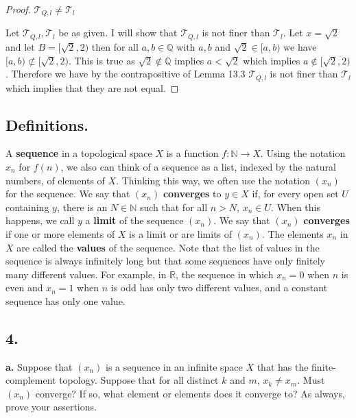 \documentclass{amsart}
\theoremstyle{plain}
\theoremstyle{definition}
\theoremstyle{remark}
\begin{document}
\begin{proof}{$\mathcal T_{Q,l}\not= \mathcal T_l$}
    
 Let $\mathcal{T}_{Q,l},\mathcal T_l$ be as given. I will show that $\mathcal{T}_{Q,l}$ is not finer than $\mathcal{T}_l$. Let $x=\sqrt{2}$ and let $B=[\sqrt{2},2)$ then for all $a,b\in \mathbb{Q}$ with $a,b$ and $\sqrt{2}\in [a,b)$ we have $[a,b)\not \subset [\sqrt{2},2)$. This is true as $\sqrt{2}\not \in \mathbb{Q}$ implies $a<\sqrt{2}$ which implies $a\not \in [\sqrt{2},2)$. Therefore we have by the contrapositive of Lemma 13.3 $\mathcal{T}_{Q,l}$ is not finer than $\mathcal{T}_l$ which implies that they are not equal. 



\end{proof}



\subsection*{Definitions.} A {\bfseries sequence} in a topological space $X$ is a function $f : \mathbb N \rightarrow X$. Using the notation $x_n$ for $f(n)$, we also can think of a sequence as a list, indexed by the natural numbers, of elements of $X$. Thinking this way, we often use the notation $(x_n)$ for the sequence. We say that $(x_n)$ {\bfseries converges} to $y\in X$ if, for every open set $U$ containing $y$, there is an $N\in \mathbb N$ such that for all $n > N$, $x_n \in U$. When this happens, we call $y$ a {\bfseries limit} of the sequence $(x_n)$. We say that $(x_n)$ {\bfseries converges} if one or more elements of $X$ is a limit or are limits of $(x_n)$. The elements $x_n$ in $X$ are called the {\bfseries values} of the sequence. Note that the list of values in the sequence is always infinitely long but that some sequences have only finitely many different values. For example, in $\mathbb R$, the sequence in which $x_n = 0$ when $n$ is even and $x_n = 1$ when $n$ is odd has only two different values, and a constant sequence has only one value.

\vspace{.15in}

\noindent
\subsection*{4.}

{\bfseries a.} Suppose that $(x_n)$ is a sequence in an infinite space $X$ that has the finite-complement topology. Suppose that for all distinct $k$ and $m$, $x_k\ne x_m$. Must $(x_n)$ converge? If so, what element or elements does it converge to? As always, prove your assertions.
\end{document}
